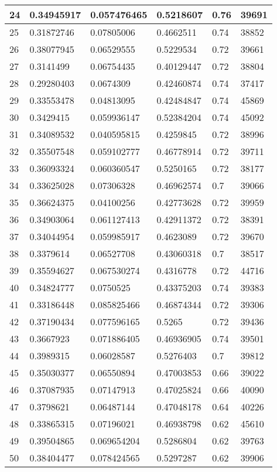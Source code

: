 \begin{longtable}{|l|l|l|l|l|l|}
24 & 0.34945917 & 0.057476465 & 0.5218607 & 0.76 & 39691 \\ \hline 
25 & 0.31872746 & 0.07805006 & 0.4662511 & 0.74 & 38852 \\ \hline 
26 & 0.38077945 & 0.06529555 & 0.5229534 & 0.72 & 39661 \\ \hline 
27 & 0.3141499 & 0.06754435 & 0.40129447 & 0.72 & 38804 \\ \hline 
28 & 0.29280403 & 0.0674309 & 0.42460874 & 0.74 & 37417 \\ \hline 
29 & 0.33553478 & 0.04813095 & 0.42484847 & 0.74 & 45869 \\ \hline 
30 & 0.3429415 & 0.059936147 & 0.52384204 & 0.74 & 45092 \\ \hline 
31 & 0.34089532 & 0.040595815 & 0.4259845 & 0.72 & 38996 \\ \hline 
32 & 0.35507548 & 0.059102777 & 0.46778914 & 0.72 & 39711 \\ \hline 
33 & 0.36093324 & 0.060360547 & 0.5250165 & 0.72 & 38177 \\ \hline 
34 & 0.33625028 & 0.07306328 & 0.46962574 & 0.7 & 39066 \\ \hline 
35 & 0.36624375 & 0.04100256 & 0.42773628 & 0.72 & 39959 \\ \hline 
36 & 0.34903064 & 0.061127413 & 0.42911372 & 0.72 & 38391 \\ \hline 
37 & 0.34044954 & 0.059985917 & 0.4623089 & 0.72 & 39670 \\ \hline 
38 & 0.3379614 & 0.06527708 & 0.43060318 & 0.7 & 38517 \\ \hline 
39 & 0.35594627 & 0.067530274 & 0.4316778 & 0.72 & 44716 \\ \hline 
40 & 0.34824777 & 0.0750525 & 0.43375203 & 0.74 & 39383 \\ \hline 
41 & 0.33186448 & 0.085825466 & 0.46874344 & 0.72 & 39306 \\ \hline 
42 & 0.37190434 & 0.077596165 & 0.5265 & 0.72 & 39436 \\ \hline 
43 & 0.3667923 & 0.071886405 & 0.46936905 & 0.74 & 39501 \\ \hline 
44 & 0.3989315 & 0.06028587 & 0.5276403 & 0.7 & 39812 \\ \hline 
45 & 0.35030377 & 0.06550894 & 0.47003853 & 0.66 & 39022 \\ \hline 
46 & 0.37087935 & 0.07147913 & 0.47025824 & 0.66 & 40090 \\ \hline 
47 & 0.3798621 & 0.06487144 & 0.47048178 & 0.64 & 40226 \\ \hline 
48 & 0.33865315 & 0.07196021 & 0.46938798 & 0.62 & 45610 \\ \hline 
49 & 0.39504865 & 0.069654204 & 0.5286804 & 0.62 & 39763 \\ \hline 
50 & 0.38404477 & 0.078424565 & 0.5297287 & 0.62 & 39906 \\ \hline 
\end{longtable}